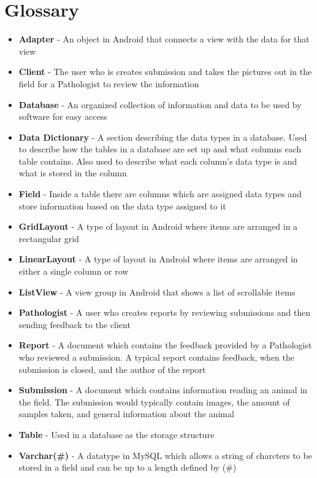 \documentclass[onecolumn, draftclsnofoot,10pt, compsoc]{IEEEtran}
\begin{document}
\section{Glossary}
\begin{itemize}
\item \textbf{Adapter} - An object in Android that connects a view with the data for that view
\item \textbf{Client} - The user who is creates submission and takes the pictures out in the field for a Pathologist to review the information
\item \textbf{Database} - An organized collection of information and data to be used by software for easy access
\item \textbf{Data Dictionary} - A section describing the data types in a database. Used to describe how the tables in a database are set up and what columns each table contains. Also used to describe what each column's data type is and what is stored in the column
\item \textbf{Field} - Inside a table there are columns which are assigned data types and store information based on the data type assigned to it 
\item \textbf{GridLayout} - A type of layout in Android where items are arranged in a rectangular grid
\item \textbf{LinearLayout} - A type of layout in Android where items are arranged in either a single column or row
\item \textbf{ListView} - A view group in Android that shows a list of scrollable items
\item \textbf{Pathologist} - A user who creates reports by reviewing submissions and then sending feedback to the client
\item \textbf{Report} - A document which contains the feedback provided by a Pathologist who reviewed a submission. A typical report contains feedback, when the submission is closed, and the author of the report
\item \textbf{Submission} - A document which contains information reading an animal in the field. The submission would typically contain images, the amount of samples taken, and general information about the animal
\item \textbf{Table} - Used in a database as the storage structure
\item \textbf{Varchar(\#)} - A datatype in MySQL which allows a string of charcters to be stored in a field and can be up to a length defined by (\#)
\end{itemize}
\end{document}
